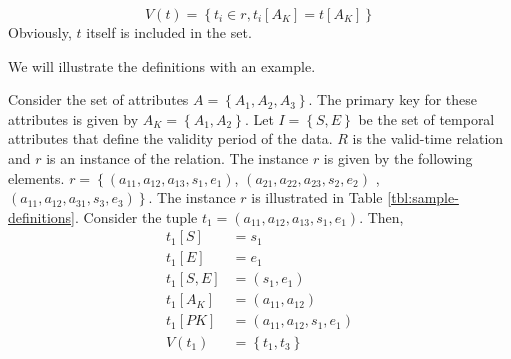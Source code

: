 \begin{definition}
\begin{itemize}
\begin{equation}
 \label{eq:all-the-versions}
V(t) =\left \lbrace t_i \in r, t_i\left[A_K\right] = t\left[A_K\right] \right \rbrace
\end{equation}
Obviously, $t$ itself is included in the set.
\end{itemize}
\end{definition}
We will illustrate the definitions with an example.

\begin{example}
Consider the set of attributes $A = \left \lbrace A_1, A_2, A_3 \right \rbrace$. The primary key for these attributes is given by $A_K = \left \lbrace A_1, A_2 \right \rbrace$. Let $I = \left \lbrace S, E \right \rbrace$ be the set of temporal attributes that define the validity period of the data. $R$ is the valid-time relation and $r$ is an instance of the relation. The instance $r$ is given by the following elements. $r = \left \lbrace \left(a_{11}, a_{12}, a_{13}, s_1 ,e_1 \right) \right.$,  $\left(a_{21}, a_{22}, a_{23}, s_2, e_2 \right)$ , $\left. \left(a_{11}, a_{12}, a_{31}, s_3, e_3 \right) \right \rbrace$. The instance $r$ is illustrated in Table \ref{tbl:sample-definitions}. 
Consider the tuple $t_1 = \left(a_{11}, a_{12}, a_{13}, s_1 ,e_1 \right)$. Then,
\begin{align}
 \nonumber
 t_1\left[S \right]&=s_1\\
 \nonumber
t_1[E]&=e_1\\
 \nonumber
t_1[S,E]&= \left(s_1, e_1\right)\\
 \nonumber
t_1\left[A_K\right] &= \left(a_{11}, a_{12} \right) \\
 \nonumber
t_1\left[PK\right] &=\left(a_{11}, a_{12}, s_1, e_1\right)\\
 \nonumber
V(t_1) &= \left \lbrace t_1, t_3 \right \rbrace
\end{align}



\end{example}

